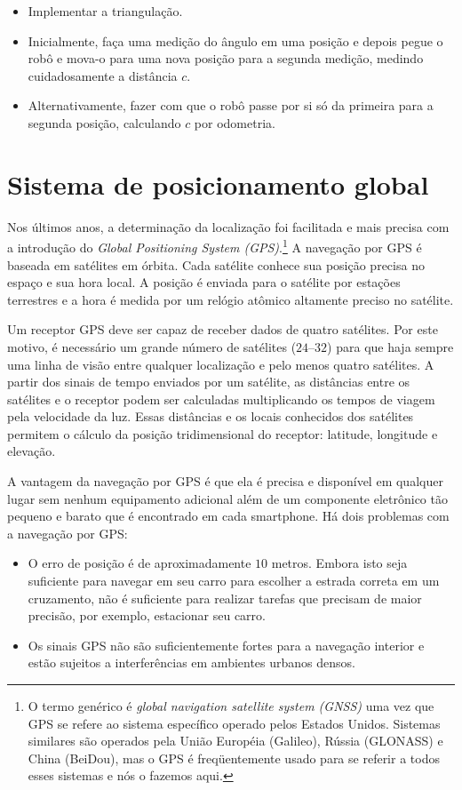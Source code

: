 \begin{framed}
\begin{itemize}
\item Implementar a triangulação.
\item Inicialmente, faça uma medição do ângulo em uma posição e depois pegue o robô e mova-o para uma nova posição para a segunda medição, medindo cuidadosamente a distância $c$.
\item Alternativamente, fazer com que o robô passe por si só da primeira para a segunda posição, calculando $c$ por odometria.
\end{itemize}
\end{framed}

\section{Sistema de posicionamento global}\label{s.gps}

Nos últimos anos, a determinação da localização foi facilitada e mais precisa com a introdução do \emph{Global Positioning System (GPS)}.\footnote{O termo genérico é \emph{global navigation satellite system (GNSS)} uma vez que GPS se refere ao sistema específico operado pelos Estados Unidos. Sistemas similares são operados pela União Européia (Galileo), Rússia (GLONASS) e China (BeiDou), mas o GPS é freqüentemente usado para se referir a todos esses sistemas e nós o fazemos aqui.} A navegação por GPS é baseada em satélites em órbita. Cada satélite conhece sua posição precisa no espaço e sua hora local. A posição é enviada para o satélite por estações terrestres e a hora é medida por um relógio atômico altamente preciso no satélite.

Um receptor GPS deve ser capaz de receber dados de quatro satélites. Por este motivo, é necessário um grande número de satélites ($24$--$32$) para que haja sempre uma linha de visão entre qualquer localização e pelo menos quatro satélites. A partir dos sinais de tempo enviados por um satélite, as distâncias entre os satélites e o receptor podem ser calculadas multiplicando os tempos de viagem pela velocidade da luz. Essas distâncias e os locais conhecidos dos satélites permitem o cálculo da posição tridimensional do receptor: latitude, longitude e elevação.

A vantagem da navegação por GPS é que ela é precisa e disponível em qualquer lugar sem nenhum equipamento adicional além de um componente eletrônico tão pequeno e barato que é encontrado em cada smartphone. Há dois problemas com a navegação por GPS:
\begin{itemize}
\item O erro de posição é de aproximadamente $10$ metros. Embora isto seja suficiente para navegar em seu carro para escolher a estrada correta em um cruzamento, não é suficiente para realizar tarefas que precisam de maior precisão, por exemplo, estacionar seu carro.
\item Os sinais GPS não são suficientemente fortes para a navegação interior e estão sujeitos a interferências em ambientes urbanos densos.
\end{itemize}

